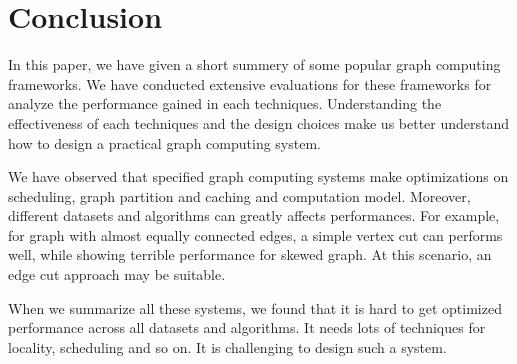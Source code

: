 \section{Conclusion} \label{con}
In this paper, we have given a short summery of some popular graph computing
frameworks. We have conducted extensive evaluations for these frameworks
for analyze the performance gained in each techniques. Understanding
the effectiveness of each techniques and the design choices
make us better understand how to design a practical graph computing system.

We have observed that specified graph computing systems make optimizations
on scheduling, graph partition and caching and computation model.
Moreover, different datasets and algorithms can greatly affects performances.
For example, for graph with almost equally connected edges, a simple vertex cut
can performs well, while showing terrible performance for skewed graph.
At this scenario, an edge cut approach may be suitable.

When we summarize all these systems, we found that it is hard to get optimized
performance across all datasets and algorithms. It needs lots of techniques for
locality, scheduling and so on. It is challenging to design such a system. 

